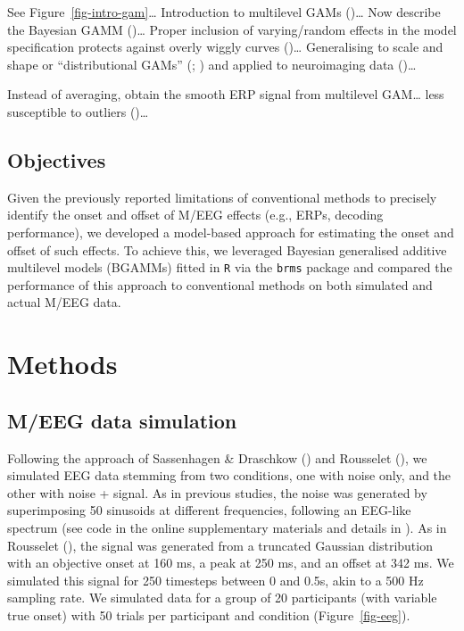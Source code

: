 \documentclass[
  man,
  floatsintext,
  longtable,
  a4paper,
  nolmodern,
  notxfonts,
  notimes,
  colorlinks=true,linkcolor=blue,citecolor=blue,urlcolor=blue]{apa7}
\begin{document}
See Figure~\ref{fig-intro-gam}\ldots{} Introduction to multilevel GAMs
()\ldots{} Now describe the Bayesian GAMM
()\ldots{} Proper inclusion of
varying/random effects in the model specification protects against
overly wiggly curves ()\ldots{} Generalising to scale and shape or ``distributional
GAMs'' (;
) and applied to
neuroimaging data ()\ldots{}

Instead of averaging, obtain the smooth ERP signal from multilevel
GAM\ldots{} less susceptible to outliers
()\ldots{}

\subsection{Objectives}\label{objectives}

Given the previously reported limitations of conventional methods to
precisely identify the onset and offset of M/EEG effects (e.g., ERPs,
decoding performance), we developed a model-based approach for
estimating the onset and offset of such effects. To achieve this, we
leveraged Bayesian generalised additive multilevel models (BGAMMs)
fitted in \texttt{R} via the \texttt{brms} package and compared the
performance of this approach to conventional methods on both simulated
and actual M/EEG data.

\section{Methods}\label{methods}

\subsection{M/EEG data simulation}\label{meeg-data-simulation}

Following the approach of Sassenhagen \& Draschkow
() and Rousselet
(), we simulated EEG data
stemming from two conditions, one with noise only, and the other with
noise + signal. As in previous studies, the noise was generated by
superimposing 50 sinusoids at different frequencies, following an
EEG-like spectrum (see code in the online supplementary materials and
details in ). As in
Rousselet (), the signal was
generated from a truncated Gaussian distribution with an objective onset
at 160 ms, a peak at 250 ms, and an offset at 342 ms. We simulated this
signal for 250 timesteps between 0 and 0.5s, akin to a 500 Hz sampling
rate. We simulated data for a group of 20 participants (with variable
true onset) with 50 trials per participant and condition
(Figure~\ref{fig-eeg}).
\end{document}
